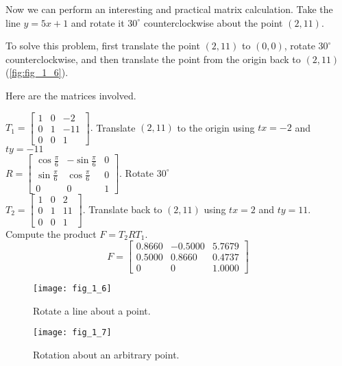 \documentclass[../main.tex]{subfiles}
\begin{document}
\begin{example} Now we can perform an interesting and practical matrix calculation. Take the line $y=5 x+1$ and rotate it $30^{\circ}$ counterclockwise about the point $(2,11)$.

To solve this problem, first translate the point $(2,11)$ to $(0,0)$, rotate $30^{\circ}$ counterclockwise, and then translate the point from the origin back to $(2,11)$ (\autoref{fig:fig_1_6}).

Here are the matrices involved.

$T_{1}=\left[\begin{array}{ccc}1 & 0 & -2 \\ 0 & 1 & -11 \\ 0 & 0 & 1\end{array}\right] .$ Translate $(2,11)$ to the origin using $t x=-2$ and $t y=-11$\\

$R=\left[\begin{array}{ccc}\cos \frac{\pi}{6} & -\sin \frac{\pi}{6} & 0 \\ \sin \frac{\pi}{6} & \cos \frac{\pi}{6} & 0 \\ 0 & 0 & 1\end{array}\right] .$ Rotate $30^{\circ}$\\

$T_{2}=\left[\begin{array}{lll}1 & 0 & 2 \\ 0 & 1 & 11 \\ 0 & 0 & 1\end{array}\right] .$ Translate back to $(2,11)$ using $t x=2$ and $t y=11 .$\\

Compute the product $F=T_{2} R T_{1}$.
$$
F=\left[\begin{array}{ccc}
0.8660 & -0.5000 & 5.7679 \\
0.5000 & 0.8660 & 0.4737 \\
0 & 0 & 1.0000
\end{array}\right]
$$

\begin{figure}
	\centering
	\texttt{[image: fig\_1\_6]}
	\caption{Rotate a line about a point.}
	\label{fig:fig_1_6}
\end{figure}

\begin{figure}
	\centering
	\texttt{[image: fig\_1\_7]}
	\caption{ Rotation about an arbitrary point.}
	\label{fig:fig_1_7}
\end{figure}


\end{example}
\end{document}
